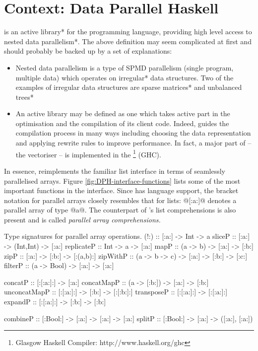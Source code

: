 \documentclass[preamble.tex]{subfiles}
\begin{document}
\clearpage

\section{Context: Data Parallel Haskell}
\label{sec:DPH}

\idph{} is an \*active library* for the \Haskell programming language, providing high level access to \*nested data parallelism*. The above definition may seem complicated at first and should probably be backed up by a set of explanations:
\begin{itemize}
\item Nested data parallelism is a type of SPMD parallelism (single program, multiple data) which operates on \*irregular* data structures. Two of the examples of irregular data structures are \*sparse matrices* and \*unbalanced trees*

\item An active library may be defined as one which takes active part in the optimisation and the compilation of its client code. Indeed, \DPH guides the compilation process in many ways including choosing the data representation \cite{CDL09} and applying rewrite rules \cite{PTH01} to improve performance. In fact, a major part of \DPH -- the vectoriser -- is implemented in the \footnote{Glasgow Haskell Compiler: http://www.haskell.org/ghc} (GHC).

\end{itemize}
In essence, \DPH reimplements the familiar list interface in terms of seamlessly parallelised arrays. Figure \ref{fig:DPH-interface-functions} lists some of the most important functions in the \DPH interface. Since \DPH has language support, the bracket notation for parallel arrays closely resembles that for \Haskell lists: @[:a:]@ denotes a parallel array of type @a@. The counterpart of \Haskell's list comprehensions is also present and is called \emph{parallel array comprehensions.}

\begin{hscode2}{Type signatures for parallel array operations. \label{fig:DPH-interface-functions}}
(!:)         :: [:a:] -> Int -> a
sliceP       :: [:a:] -> (Int,Int) -> [:a:]
replicateP   :: Int -> a -> [:a:]
mapP         :: (a -> b) -> [:a:] -> [:b:]
zipP         :: [:a:] -> [:b:] -> [:(a,b):]
zipWithP     :: (a -> b -> c) -> [:a:] -> [:b:] -> [:c:]
filterP      :: (a -> Bool) -> [:a:] -> [:a:]

concatP      :: [:[:a:]:] -> [:a:]
concatMapP   :: (a -> [:b:]) -> [:a:] -> [:b:]
unconcatMapP :: [:[:a:]:] -> [:b:] -> [:[:b:]:]
transposeP   :: [:[:a:]:] -> [:[:a:]:]
expandP      :: [:[:a:]:] -> [:b:] -> [:b:]

combineP     :: [:Bool:] -> [:a:] -> [:a:] -> [:a:]
splitP       :: [:Bool:] -> [:a:] -> ([:a:], [:a:])
\end{hscode2}
\end{document}
